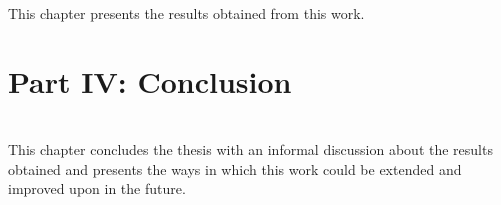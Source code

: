   \vspace{1mm}\\
\noindent This chapter presents the results obtained from this work.\\

\section*{Part IV: Conclusion}
  \vspace{1mm}\\
\noindent This chapter concludes the thesis with an informal discussion about the results obtained and presents the ways in which this work could be extended and improved upon in the future.\\
